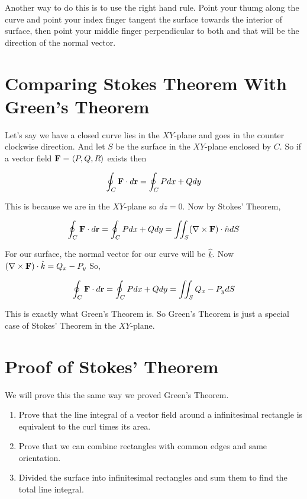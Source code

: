 Another way to do this is to use the right hand rule.
Point your thumg along the curve and point your index finger tangent the surface towards the interior of surface, 
then point your middle finger perpendicular to both and that will be the direction of the normal vector. 


\section{Comparing Stokes Theorem With Green's Theorem}

Let's say we have a closed curve lies in the $XY$-plane and goes in the counter clockwise direction.
And let $S$ be the surface in the $XY$-plane enclosed by $C$.
So if a vector field ${\bf F} = \left< P, Q, R \right>$ exists then 

$$ \oint_C {\bf F} \cdot d{\bf r} = \oint_C Pdx + Qdy $$

This is because we are in the $XY$-plane so $dz = 0$.
Now by Stokes' Theorem, 

$$ 
\oint_C {\bf F} \cdot d{\bf r} 
= \oint_C Pdx + Qdy 
= \iint_S (\nabla \times {\bf F}) \cdot \hat{n} dS 
$$

For our surface, the normal vector for our curve  will be $\hat{k}$. Now $(\nabla \times {\bf F}) \cdot \hat{k} = Q_x - P_y$
So, 

$$
\oint_C {\bf F} \cdot d{\bf r} 
= \oint_C Pdx + Qdy 
= \iint_S Q_x - P_y dS 
$$

This is exactly what Green's Theorem is. 
So Green's Theorem is just a special case of Stokes' Theorem in the $XY$-plane.


\section{Proof of Stokes' Theorem}

We will prove this the same way we proved Green's Theorem.

\begin{enumerate}
    \item Prove that the line integral of a vector field around a infinitesimal rectangle is equivalent to the curl times its area.
    \item Prove that we can combine rectangles with common edges and same orientation.
    \item Divided the surface into infinitesimal rectangles and sum them to find the total line integral.
\end{enumerate}


